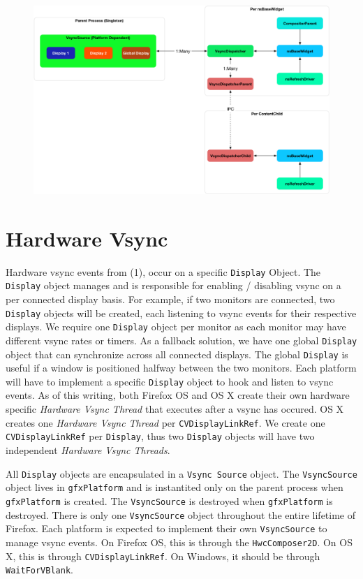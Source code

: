 \documentclass{article}
\begin{document}
\begin{figure}[ht]
\centering
\includegraphics[scale=0.75]{architecture.png}
\end{figure}

\section{Hardware Vsync}
\label{sec:vsync}
Hardware vsync events from (1), occur on a specific \texttt{Display} Object.
The \texttt{Display} object manages and is responsible for enabling / disabling vsync on a per connected display basis.
For example, if two monitors are connected, two \texttt{Display} objects will be created, each listening to vsync events for their respective displays.
We require one \texttt{Display} object per monitor as each monitor may have different vsync rates or timers.
As a fallback solution, we have one global \texttt{Display} object that can synchronize across all connected displays.
The global \texttt{Display} is useful if a window is positioned halfway between the two monitors.
Each platform will have to implement a specific \texttt{Display} object to hook and listen to vsync events.
As of this writing, both Firefox OS and OS X create their own hardware specific \textit{Hardware Vsync Thread} that executes after a vsync has occured.
OS X creates one \textit{Hardware Vsync Thread} per \texttt{CVDisplayLinkRef}.
We create one \texttt{CVDisplayLinkRef} per \texttt{Display}, thus two \texttt{Display} objects will have two independent \textit{Hardware Vsync Threads}.

All \texttt{Display} objects are encapsulated in a \texttt{Vsync Source} object.
The \texttt{VsyncSource} object lives in \texttt{gfxPlatform} and is instantited only on the parent process when \texttt{gfxPlatform} is created.
The \texttt{VsyncSource} is destroyed when \texttt{gfxPlatform} is destroyed.
There is only one \texttt{VsyncSource} object throughout the entire lifetime of Firefox.
Each platform is expected to implement their own \texttt{VsyncSource} to manage vsync events.
On Firefox OS, this is through the \texttt{HwcComposer2D}.
On OS X, this is through \texttt{CVDisplayLinkRef}.
On Windows, it should be through \texttt{WaitForVBlank}.
\end{document}
